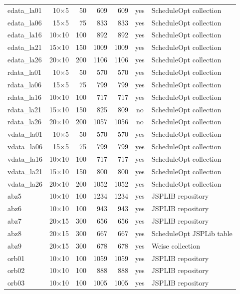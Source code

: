 {\begin{longtable}{lrrrrcl}
edata\_la01 & 10$\times$5 & 50 & 609 & 609 & yes & ScheduleOpt collection \\
edata\_la06 & 15$\times$5 & 75 & 833 & 833 & yes & ScheduleOpt collection \\
edata\_la16 & 10$\times$10 & 100 & 892 & 892 & yes & ScheduleOpt collection \\
edata\_la21 & 15$\times$10 & 150 & 1009 & 1009 & yes & ScheduleOpt collection \\
edata\_la26 & 20$\times$10 & 200 & 1106 & 1106 & yes & ScheduleOpt collection \\
rdata\_la01 & 10$\times$5 & 50 & 570 & 570 & yes & ScheduleOpt collection \\
rdata\_la06 & 15$\times$5 & 75 & 799 & 799 & yes & ScheduleOpt collection \\
rdata\_la16 & 10$\times$10 & 100 & 717 & 717 & yes & ScheduleOpt collection \\
rdata\_la21 & 15$\times$10 & 150 & 825 & 809 & no & ScheduleOpt collection \\
rdata\_la26 & 20$\times$10 & 200 & 1057 & 1056 & no & ScheduleOpt collection \\
vdata\_la01 & 10$\times$5 & 50 & 570 & 570 & yes & ScheduleOpt collection \\
vdata\_la06 & 15$\times$5 & 75 & 799 & 799 & yes & ScheduleOpt collection \\
vdata\_la16 & 10$\times$10 & 100 & 717 & 717 & yes & ScheduleOpt collection \\
vdata\_la21 & 15$\times$10 & 150 & 800 & 800 & yes & ScheduleOpt collection \\
vdata\_la26 & 20$\times$10 & 200 & 1052 & 1052 & yes & ScheduleOpt collection \\
abz5 & 10$\times$10 & 100 & 1234 & 1234 & yes & JSPLIB repository \\
abz6 & 10$\times$10 & 100 & 943 & 943 & yes & JSPLIB repository \\
abz7 & 20$\times$15 & 300 & 656 & 656 & yes & JSPLIB repository \\
abz8 & 20$\times$15 & 300 & 667 & 667 & yes & ScheduleOpt JSPLib table \\
abz9 & 20$\times$15 & 300 & 678 & 678 & yes & Weise collection \\
orb01 & 10$\times$10 & 100 & 1059 & 1059 & yes & JSPLIB repository \\
orb02 & 10$\times$10 & 100 & 888 & 888 & yes & JSPLIB repository \\
orb03 & 10$\times$10 & 100 & 1005 & 1005 & yes & JSPLIB repository \\

\end{longtable}}
